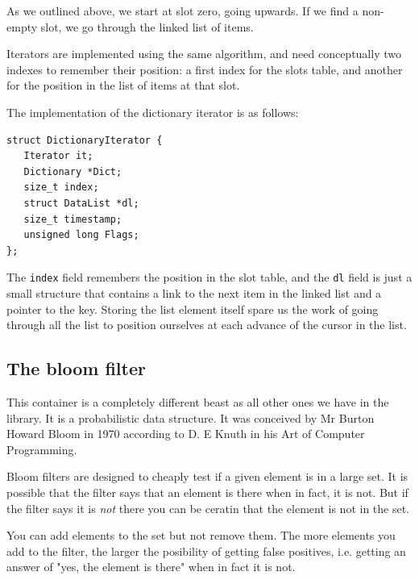 \documentclass[12pt,a4paper]{memoir} %
\newcommand{\container}{}
\begin{document}
{{As we outlined above, we start at slot zero, going upwards. If we find a non-empty slot, we go through the linked list of items.

Iterators are implemented using the same algorithm, and need conceptually two indexes to remember their position: a first index for the slots table, 
and another for the position in the list of items at that slot.

The implementation of the dictionary iterator is as follows:
\begin{verbatim}
struct DictionaryIterator {
   Iterator it;
   Dictionary *Dict;
   size_t index;
   struct DataList *dl;
   size_t timestamp;
   unsigned long Flags;
};
\end{verbatim}
The \texttt{index} field remembers the position in the slot table, and the \texttt{dl} field is just a small structure that contains a link to the 
next item in the linked list and a pointer to the key. Storing the list element itself spare us the work of going through all the list to position ourselves at each advance of the cursor in the list.
\subsection{The bloom filter}
\renewcommand{\container}{bloom filter}
This container is a completely different beast as all other ones we have in the library. It is a probabilistic data structure. It was conceived by
Mr Burton Howard Bloom in 1970 according to D. E Knuth in his Art of Computer Programming.

Bloom filters are designed to cheaply test if a given element is in a large set. It is possible that the filter says that an element is there
when in fact, it is not. But if the filter says it is \textsl{not} there you can be ceratin that the element is not in the set.

You can add elements to the set but not remove them. The more elements you add to the filter, the larger the posibility of getting false positives, i.e.
getting an answer of "yes, the element is there" when in fact it is not.


}}
\end{document}

